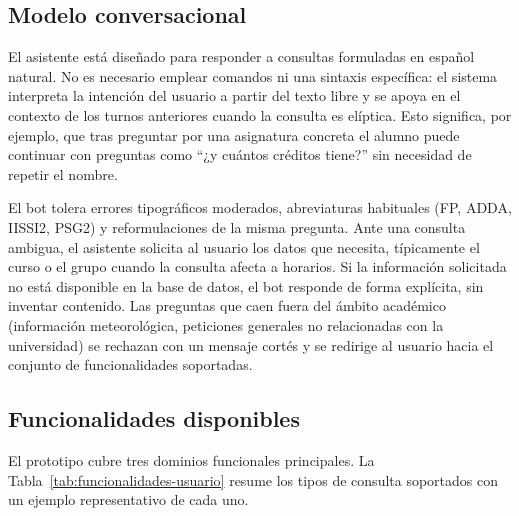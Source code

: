 \subsection{Modelo conversacional}\label{subsec:usuario-modelo}

El asistente está diseñado para responder a consultas formuladas en español natural. No es necesario emplear comandos ni una sintaxis específica: el sistema interpreta la intención del usuario a partir del texto libre y se apoya en el contexto de los turnos anteriores cuando la consulta es elíptica. Esto significa, por ejemplo, que tras preguntar por una asignatura concreta el alumno puede continuar con preguntas como ``¿y cuántos créditos tiene?'' sin necesidad de repetir el nombre.

El bot tolera errores tipográficos moderados, abreviaturas habituales (FP, ADDA, IISSI2, PSG2) y reformulaciones de la misma pregunta. Ante una consulta ambigua, el asistente solicita al usuario los datos que necesita, típicamente el curso o el grupo cuando la consulta afecta a horarios. Si la información solicitada no está disponible en la base de datos, el bot responde de forma explícita, sin inventar contenido. Las preguntas que caen fuera del ámbito académico (información meteorológica, peticiones generales no relacionadas con la universidad) se rechazan con un mensaje cortés y se redirige al usuario hacia el conjunto de funcionalidades soportadas.

\subsection{Funcionalidades disponibles}\label{subsec:usuario-funcionalidades}

El prototipo cubre tres dominios funcionales principales. La Tabla~\ref{tab:funcionalidades-usuario} resume los tipos de consulta soportados con un ejemplo representativo de cada uno.

